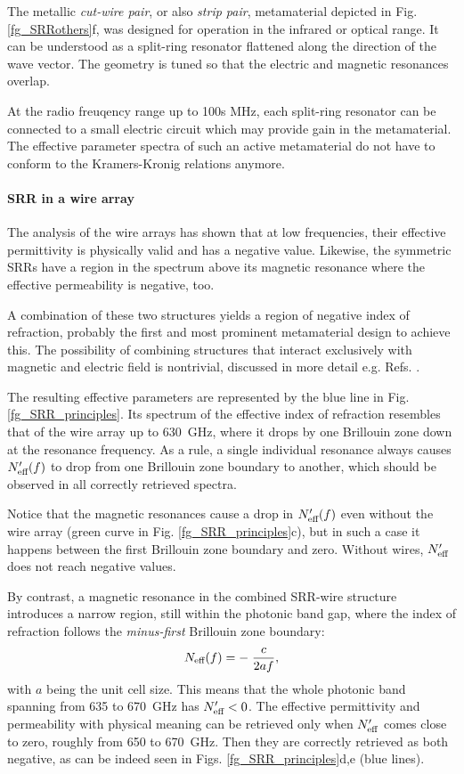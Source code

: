 The metallic \textit{cut-wire pair}, or also \textit{strip pair}, metamaterial depicted in Fig. \ref{fg_SRRothers}f, was designed for operation in the infrared or optical range. It can be understood as a split-ring resonator flattened along the direction of the wave vector. The geometry is tuned so that the electric and magnetic resonances overlap.	

At the radio freuqency range up to 100s MHz, each split-ring resonator can be connected to a small electric circuit which may provide gain \cite{jelinek2011fet} in the metamaterial. The effective parameter spectra of such an active metamaterial do not have to conform to the Kramers-Kronig relations anymore.

\paragraph{SRR in a wire array} %
The analysis of the wire arrays has shown that at low frequencies, their effective permittivity is physically valid and has a negative value. Likewise, the symmetric SRRs have a region in the spectrum above its magnetic resonance where the effective permeability is negative, too.

A combination of these two structures yields a region of negative index of refraction, probably the first \cite{pendry2000negative} and most prominent metamaterial design to achieve this. The possibility of combining structures that interact exclusively with magnetic and electric field is nontrivial, discussed  in more detail e.g. Refs. \cite{koschny2004effective, baena2007towards}.

The resulting effective parameters are represented by the blue line in Fig. \ref{fg_SRR_principles}. Its spectrum of the effective index of refraction resembles that of the wire array up to 630~GHz, where it drops by one Brillouin zone down at the resonance frequency.
As a rule, a single individual resonance always causes $N_{\text{eff} }'(f)$ to drop from one Brillouin zone boundary to another, which should be observed in all correctly retrieved spectra. 

Notice that the magnetic resonances cause a drop in $N_{\text{eff} }'(f)$ even without the wire array (green curve in Fig. \ref{fg_SRR_principles}c), but in such a case it happens between the first Brillouin zone boundary and zero. Without wires, $N_{\text{eff} }'$ does not reach negative values.

By contrast, a magnetic resonance in the combined SRR-wire structure introduces a narrow region, still within the photonic band gap, where the index of refraction follows the \textit{minus-first} Brillouin zone boundary:
\begin{equation} N_{\text{eff} }(f) = -\;\frac{c}{2 a f}, \label{eq_BZN2}\end{equation}
with $a$ being the unit cell size. This means that the whole photonic band spanning from 635 to 670~GHz has $N_{\text{eff} }'<0$. The effective permittivity and permeability with physical meaning can be retrieved only when $N_{\text{eff} }'$ comes close to zero, roughly from 650 to 670~GHz. Then they are correctly retrieved as both negative, as can be indeed seen in Figs. \ref{fg_SRR_principles}d,e (blue lines).

